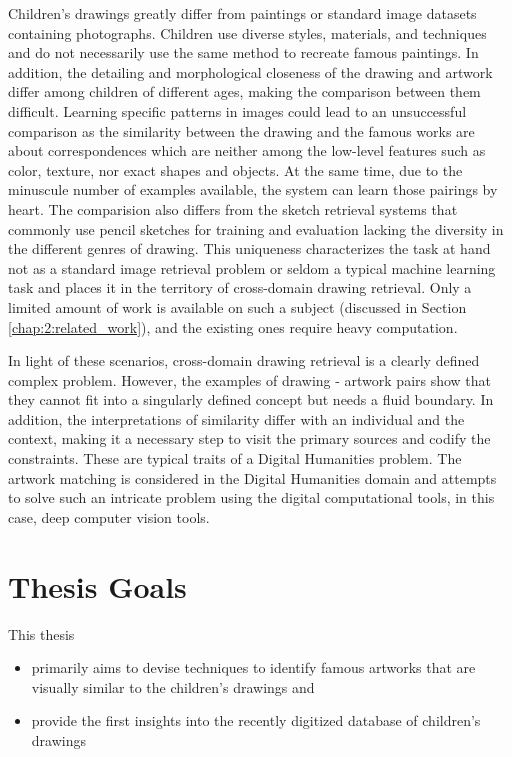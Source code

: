 Children's drawings greatly differ from paintings or standard image datasets containing photographs. Children use diverse styles, materials, and techniques and do not necessarily use the same method to recreate famous paintings. In addition, the detailing and morphological closeness of the drawing and artwork differ among children of different ages, making the comparison between them difficult. Learning specific patterns in images could lead to an unsuccessful comparison as the similarity between the drawing and the famous works are about correspondences which are neither among the low-level features such as color, texture, nor exact shapes and objects. At the same time, due to the minuscule number of examples available, the system can learn those pairings by heart. The comparision also differs from the sketch retrieval systems that commonly use pencil sketches for training and evaluation \cite{Yi2018SBIR} lacking the diversity in the different genres of drawing. This uniqueness characterizes the task at hand not as a standard image retrieval problem or seldom a typical machine learning task and places it in the territory of cross-domain drawing retrieval. Only a limited amount of work is available on such a subject (discussed in Section \ref{chap:2:related_work}), and the existing ones require heavy computation.

In light of these scenarios, cross-domain drawing retrieval is a clearly defined complex problem. However, the examples of drawing - artwork 
pairs show that they cannot fit into a singularly defined concept but needs a fluid boundary. In addition, the interpretations of similarity differ with an individual and the context, making it a necessary step to visit the primary sources and codify the constraints. These are typical traits of a Digital Humanities problem. The artwork matching is considered in the Digital Humanities domain and attempts to solve such an intricate problem using the digital computational tools, in this case, deep computer vision tools. 

\section{Thesis Goals}

This thesis 
\begin{itemize}
    \item primarily aims to devise techniques to identify famous artworks that are visually similar to the children's drawings and
    \item provide the first insights into the recently digitized database of children's drawings
\end{itemize}


